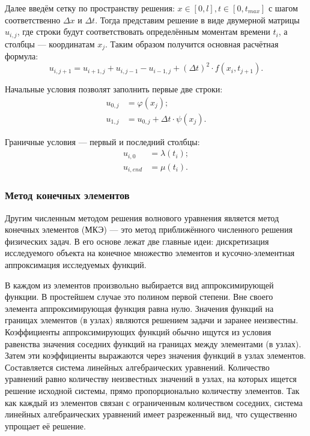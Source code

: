 \documentclass[12pt,a4paper,russian]{report}
\begin{document}
	Далее введём сетку по пространству решения: $ x \in [0, l], t \in [0, t_{max}]$ с шагом соответственно $\Delta x$ и $\Delta t$. Тогда представим решение в виде двумерной матрицы $u_{i,j}$, где строки будут соответствовать определённым моментам времени $t_i$, а столбцы --- координатам $x_j$. Таким образом получится основная расчётная формула:
	\begin{equation} \label{eq:MKR_main_foumula}
		u_{i, j + 1} = u_{i + 1, j} + u_{i, j - 1} - u_{i - 1, j} + \left( \Delta t \right)^2 \cdot f(x_i, t_{j + 1}).
	\end{equation}
	
	Начальные условия позволят заполнить первые две строки:
	\begin{equation*}
		\begin{split}
			u_{0,j} & =  \varphi (x_j); \\
			u_{1, j} & = u_{0,j} + \Delta t \cdot \psi (x_j).
		\end{split}
	\end{equation*}

	Граничные условия --- первый и последний столбцы:
	\begin{equation*}
		\begin{split}
			u_{i,0} & = \lambda (t_i); \\
			u_{i, end} & = \mu (t_i).
		\end{split}
	\end{equation*}
	
	
	\subsubsection{Метод конечных элементов}
	
	Другим численным методом решения волнового уравнения является метод конечных элементов  (МКЭ) --- это метод приближённого численного решения физических задач. В его основе лежат две главные идеи: дискретизация исследуемого объекта на конечное множество элементов и кусочно-элементная аппроксимация исследуемых функций.
	
	В каждом из элементов произвольно выбирается вид аппроксимирующей функции. В простейшем случае это полином первой степени. Вне своего элемента аппроксимирующая функция равна нулю. Значения функций на границах элементов (в узлах) являются решением задачи и заранее неизвестны. Коэффициенты аппроксимирующих функций обычно ищутся из условия равенства значения соседних функций на границах между элементами (в узлах). Затем эти коэффициенты выражаются через значения функций в узлах элементов. Составляется система линейных алгебраических уравнений. Количество уравнений равно количеству неизвестных значений в узлах, на которых ищется решение исходной системы, прямо пропорционально количеству элементов. Так как каждый из элементов связан с ограниченным количеством соседних, система линейных алгебраических уравнений имеет разреженный вид, что существенно упрощает её решение.
	
\end{document}
